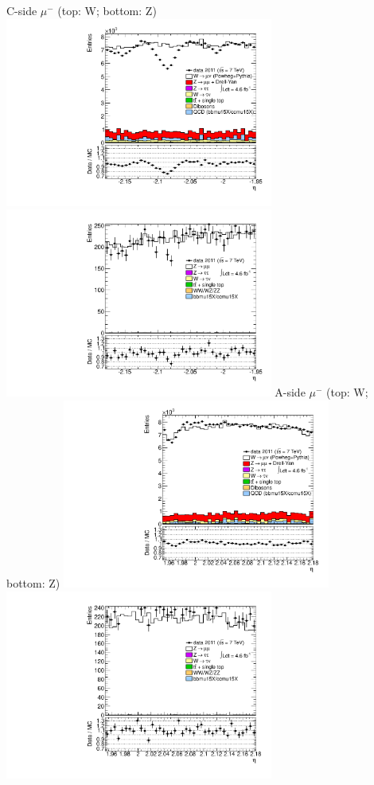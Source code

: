  {
\colb[T]
C-side $\mu^{-}$ (top: W; bottom: Z)
\centering
\includegraphics[width=0.66\textwidth]{dates/20130306/figures/both/W_10_C_stack_l_eta_NEG} \\
\includegraphics[width=0.66\textwidth]{dates/20130306/figures/both/Ztinv_10_C_stack_lN_eta_ALL.pdf}
A-side $\mu^{-}$ (top: W; bottom: Z)
\centering
\includegraphics[width=0.66\textwidth]{dates/20130306/figures/both/W_10_A_stack_l_eta_NEG} \\
\includegraphics[width=0.66\textwidth]{dates/20130306/figures/both/Ztinv_10_A_stack_lN_eta_ALL.pdf} 
\cole
}

